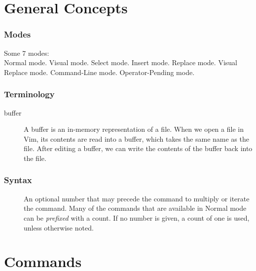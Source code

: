 \part{General Concepts}
\section{Modes}
Some 7 modes:\\
Normal mode. Visual mode. Select mode. Insert mode. Replace mode. Visual Replace mode. Command-Line mode. Operator-Pending mode.

\section{Terminology}
\begin{description}
  \item[buffer] A buffer is an in-memory representation of a file. When we open a file in Vim, its contents are read into a buffer, which takes the same name as the file. After editing a buffer, we can write the contents of the buffer back into the file.
\end{description}

\section{Syntax}
\begin{description}
  \item[\syntax{[count]}] An optional number that may precede the command to multiply or iterate the command. Many of the commands that are available in Normal mode can be \emph{prefixed} with a count. If no number is given, a count of one is used, unless otherwise noted.
\end{description}

\part{Commands}
